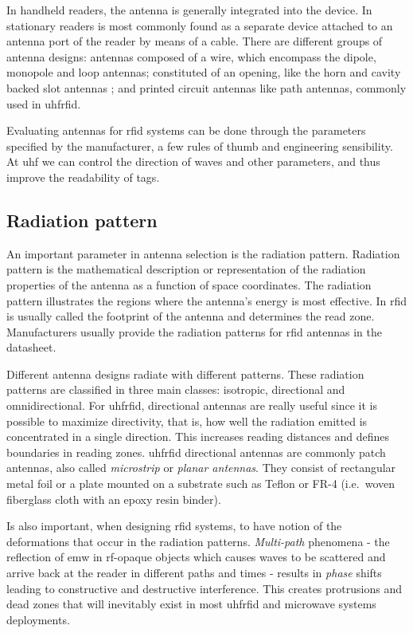 In handheld readers, the antenna is generally integrated into the device. In stationary readers is most commonly found as a separate device attached to an antenna port of the reader by means of a cable.
There are different groups of antenna designs: antennas composed of a wire, which encompass the dipole, monopole and loop antennas; constituted of an opening, like the horn and cavity backed slot antennas %
; and printed circuit antennas like path antennas, commonly used in \ac{uhfrfid}.

Evaluating antennas for \ac{rfid} systems can be done through the parameters specified by the manufacturer, a few rules of thumb and engineering sensibility.
At \ac{uhf} we can control the direction of waves and other parameters, and thus improve the readability of tags.

\subsection{Radiation pattern}

An important parameter in antenna selection is the radiation pattern. 
Radiation pattern is the mathematical description or representation of the radiation properties of the antenna as a function of space coordinates.
The radiation pattern illustrates the regions where the antenna's energy is most effective.
In \ac{rfid} is usually called the footprint of the antenna and determines the read zone.
Manufacturers usually provide the radiation patterns for \ac{rfid} antennas in the datasheet.

Different antenna designs radiate with different patterns. These radiation patterns are classified in three main classes: isotropic, directional and omnidirectional.
For \ac{uhfrfid}, directional antennas are really useful since it is possible to maximize directivity, that is, how well the radiation emitted is concentrated in a single direction. This increases reading distances and defines boundaries in reading zones. \ac{uhfrfid} directional antennas are commonly patch antennas, also called \emph{microstrip} or \emph{planar antennas}. They consist of rectangular metal foil or a plate mounted on a substrate such as Teflon or FR-4 (i.e.\ woven fiberglass cloth with an epoxy resin binder).

Is also important, when designing \ac{rfid} systems, to have notion of the deformations that occur in the radiation patterns.
\emph{Multi-path} phenomena - the reflection of \ac{emw} in \ac{rf}-opaque objects which causes waves to be scattered and arrive back at the reader in different paths and times - results in \emph{phase} shifts leading to constructive and destructive interference.
This creates protrusions and dead zones that will inevitably exist in most \ac{uhfrfid} and microwave systems deployments. 

